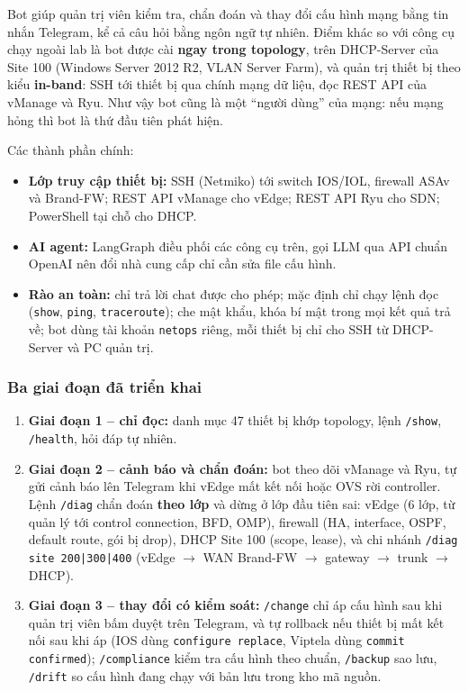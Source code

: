 Bot giúp quản trị viên kiểm tra, chẩn đoán và thay đổi cấu hình mạng bằng tin nhắn Telegram, kể cả câu hỏi bằng ngôn ngữ tự nhiên. Điểm khác so với công cụ chạy ngoài lab là bot được cài \textbf{ngay trong topology}, trên DHCP-Server của Site 100 (Windows Server 2012 R2, VLAN Server Farm), và quản trị thiết bị theo kiểu \textbf{in-band}: SSH tới thiết bị qua chính mạng dữ liệu, đọc REST API của vManage và Ryu. Như vậy bot cũng là một ``người dùng'' của mạng: nếu mạng hỏng thì bot là thứ đầu tiên phát hiện.

Các thành phần chính:

\begin{itemize}
    \item \textbf{Lớp truy cập thiết bị:} SSH (Netmiko) tới switch IOS/IOL, firewall ASAv và Brand-FW; REST API vManage cho vEdge; REST API Ryu cho SDN; PowerShell tại chỗ cho DHCP.
    \item \textbf{AI agent:} LangGraph điều phối các công cụ trên, gọi LLM qua API chuẩn OpenAI nên đổi nhà cung cấp chỉ cần sửa file cấu hình.
    \item \textbf{Rào an toàn:} chỉ trả lời chat được cho phép; mặc định chỉ chạy lệnh đọc (\texttt{show}, \texttt{ping}, \texttt{traceroute}); che mật khẩu, khóa bí mật trong mọi kết quả trả về; bot dùng tài khoản \texttt{netops} riêng, mỗi thiết bị chỉ cho SSH từ DHCP-Server và PC quản trị.
\end{itemize}

\subsubsection{Ba giai đoạn đã triển khai}

\begin{enumerate}
    \item \textbf{Giai đoạn 1 -- chỉ đọc:} danh mục 47 thiết bị khớp topology, lệnh \texttt{/show}, \texttt{/health}, hỏi đáp tự nhiên.
    \item \textbf{Giai đoạn 2 -- cảnh báo và chẩn đoán:} bot theo dõi vManage và Ryu, tự gửi cảnh báo lên Telegram khi vEdge mất kết nối hoặc OVS rời controller. Lệnh \texttt{/diag} chẩn đoán \textbf{theo lớp} và dừng ở lớp đầu tiên sai: vEdge (6 lớp, từ quản lý tới control connection, BFD, OMP), firewall (HA, interface, OSPF, default route, gói bị drop), DHCP Site 100 (scope, lease), và chi nhánh \texttt{/diag site 200|300|400} (vEdge $\rightarrow$ WAN Brand-FW $\rightarrow$ gateway $\rightarrow$ trunk $\rightarrow$ DHCP).
    \item \textbf{Giai đoạn 3 -- thay đổi có kiểm soát:} \texttt{/change} chỉ áp cấu hình sau khi quản trị viên bấm duyệt trên Telegram, và tự rollback nếu thiết bị mất kết nối sau khi áp (IOS dùng \texttt{configure replace}, Viptela dùng \texttt{commit confirmed}); \texttt{/compliance} kiểm tra cấu hình theo chuẩn, \texttt{/backup} sao lưu, \texttt{/drift} so cấu hình đang chạy với bản lưu trong kho mã nguồn.
\end{enumerate}

